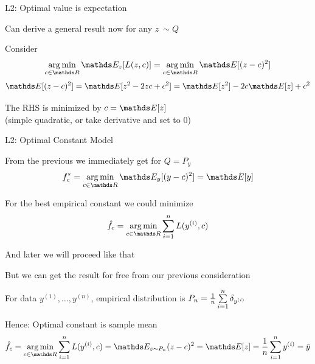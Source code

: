 \documentclass[11pt,compress,t,notes=noshow, xcolor=table]{beamer}
\begin{document}
\begin{vbframe}{L2: Optimal value is expectation}

\begin{itemizeL}
\item Can derive a general result now for any $z ~ \sim Q$
\item Consider 
$$ 
\argmin_{c \in \R}  \E_{z} [L(z, c)] = \argmin_{c \in \R}  \E [(z - c)^2] 
$$
$$
\E [(z - c)^2] =  \E [z^2 - 2zc + c^2 ] = \E[z^2] -2c\E[z] + c^2   
$$

\item The RHS is minimized by $c = \E[z]$\\
(simple quadratic, or take derivative and set to 0)



\end{itemizeL}
\end{vbframe}




\begin{vbframe}{L2: Optimal Constant Model}

\begin{itemizeS}

\item From the previous we immediately get for $Q = P_y$
$$
f_{c}^{\ast} = \argmin_{c \in \R} \E_{y} [ (y - c)^2 ] = \E[y]
$$
\item For the best empirical constant we could minimize   
$$\hat{f}_c = \argminlim_{c \in \R} \sumin L(\yi,c)$$

And later we will proceed like that
\item But we can get the result for free from our previous 
  consideration
  
\item For data $y^{(1)}, \ldots, y^{(n)}$, empirical distribution is $P_n = \frac{1}{n} \sum\limits_{i=1}^n \delta_{y^{(i)}}$
\item Hence: Optimal constant is sample mean
$$\hat{f}_c = \argminlim_{c \in \R} \sumin L(\yi,c) = 
\E_{z \sim P_n} (z-c)^2 = \E[z] = \meanin \yi = \bar{y}
$$

\end{itemizeS}


\end{vbframe}
\end{document}
